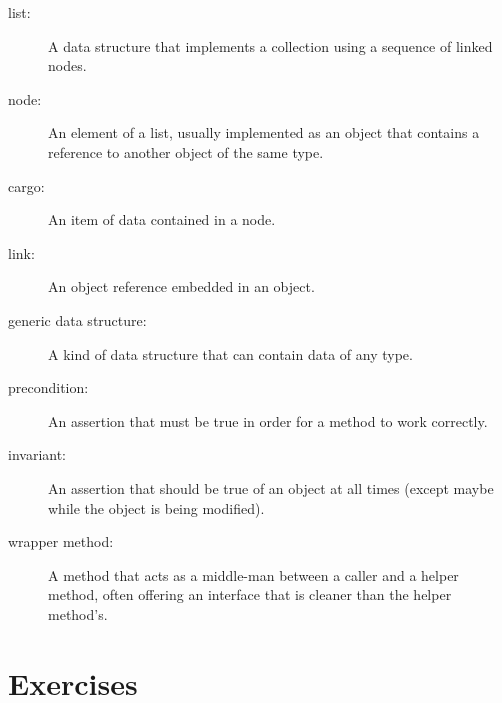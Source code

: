 \begin{description}

\item[list:] A data structure that implements a collection using
a sequence of linked nodes.

\item[node:] An element of a list, usually implemented as an object
that contains a reference to another object of the same type.

\item[cargo:] An item of data contained in a node. 

\item[link:] An object reference embedded in an object.

\item[generic data structure:] A kind of data structure that can contain data
of any type.

\item[precondition:] An assertion that must be true in order for a
method to work correctly.

\item[invariant:] An assertion that should be true of an object at
all times (except maybe while the object is being modified).

\item[wrapper method:] A method that acts as a middle-man between a
caller and a helper method, often offering an interface that is
cleaner than the helper method's.

\end{description}


\section{Exercises}

